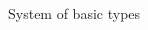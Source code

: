 \begin{figure}[h]
\begin{adjustbox}{max width=\textwidth}
\begin{tikzpicture}



    




    
\end{tikzpicture}
\end{adjustbox}

\caption{System of basic types}
\label{fig:basic}
\end{figure}

